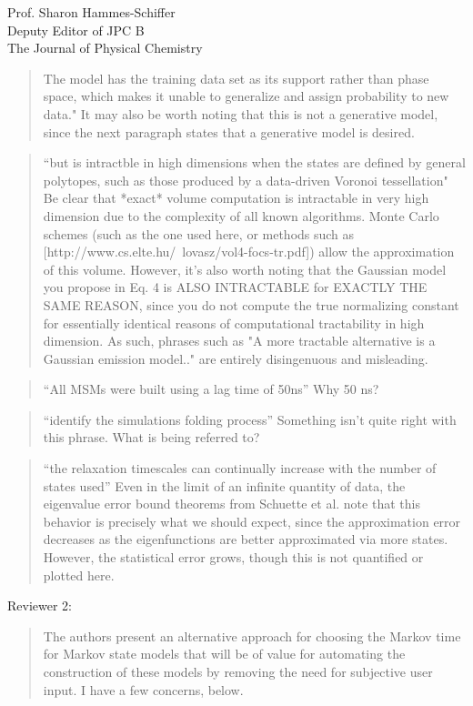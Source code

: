 \documentclass{letter}
\begin{document}
\begin{letter}{Prof. Sharon Hammes-Schiffer \\ Deputy Editor of JPC B \\ The Journal of Physical Chemistry}
\begin{quote}
The model has the training data set as its support rather than phase space, which makes it unable to generalize and assign probability to new data."  It may also be worth noting that this is not a generative model, since the next paragraph states that a generative model is desired.
\end{quote}

\begin{quote}
``but is intractble in high dimensions when the states are defined by general polytopes, such as those produced by a data-driven Voronoi tessellation"  Be clear that *exact* volume computation is intractable in very high dimension due to the complexity of all known algorithms.  Monte Carlo schemes (such as the one used here, or methods such as [http://www.cs.elte.hu/~lovasz/vol4-focs-tr.pdf]) allow the approximation of this volume.  However, it's also worth noting that the Gaussian model you propose in Eq. 4 is ALSO INTRACTABLE for EXACTLY THE SAME REASON, since you do not compute the true normalizing constant for essentially identical reasons of computational tractability in high dimension.  As such, phrases such as "A more tractable alternative is a Gaussian emission model.." are entirely disingenuous and misleading.
\end{quote}

\begin{quote}
``All MSMs were built using a lag time of 50ns''  Why 50 ns?
\end{quote}

\begin{quote}
``identify the simulations folding process''  Something isn't quite right with this phrase.  What is being referred to?
\end{quote}

\begin{quote}
``the relaxation timescales can continually increase with the number of states used''  Even in the limit of an infinite quantity of data, the eigenvalue error bound theorems from Schuette et al. note that this behavior is precisely what we should expect, since the approximation error decreases as the eigenfunctions are better approximated via more states.  However, the statistical error grows, though this is not quantified or plotted here.
\end{quote}

Reviewer 2:

\begin{quote}
The authors present an alternative approach for choosing the Markov time for Markov state models that will be of value for automating the construction of these models by removing the need for subjective user input.  I have a few concerns, below.
\end{quote}


\end{letter}
\end{document}
